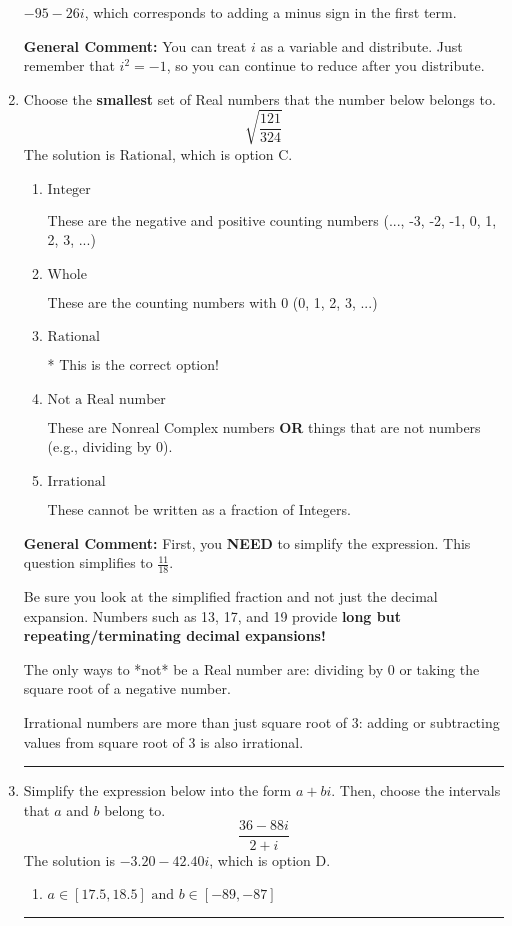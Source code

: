 \documentclass{extbook}[14pt]
\newcommand{\litem}[1]{\item #1

\rule{\textwidth}{0.4pt}}
\begin{document}
\begin{enumerate}
{\begin{enumerate}[label=\Alph*.]
 $-95 - 26 i$, which corresponds to adding a minus sign in the first term.
\end{enumerate}

\textbf{General Comment:} You can treat $i$ as a variable and distribute. Just remember that $i^2=-1$, so you can continue to reduce after you distribute.
}
\litem{
Choose the \textbf{smallest} set of Real numbers that the number below belongs to.
\[ \sqrt{\frac{121}{324}} \]The solution is \( \text{Rational} \), which is option C.\begin{enumerate}[label=\Alph*.]
\item \( \text{Integer} \)

These are the negative and positive counting numbers (..., -3, -2, -1, 0, 1, 2, 3, ...)
\item \( \text{Whole} \)

These are the counting numbers with 0 (0, 1, 2, 3, ...)
\item \( \text{Rational} \)

* This is the correct option!
\item \( \text{Not a Real number} \)

These are Nonreal Complex numbers \textbf{OR} things that are not numbers (e.g., dividing by 0).
\item \( \text{Irrational} \)

These cannot be written as a fraction of Integers.
\end{enumerate}

\textbf{General Comment:} First, you \textbf{NEED} to simplify the expression. This question simplifies to $\frac{11}{18}$. 
 
 Be sure you look at the simplified fraction and not just the decimal expansion. Numbers such as 13, 17, and 19 provide \textbf{long but repeating/terminating decimal expansions!} 
 
 The only ways to *not* be a Real number are: dividing by 0 or taking the square root of a negative number. 
 
 Irrational numbers are more than just square root of 3: adding or subtracting values from square root of 3 is also irrational.
}
\litem{
Simplify the expression below into the form $a+bi$. Then, choose the intervals that $a$ and $b$ belong to.
\[ \frac{36 - 88 i}{2 + i} \]The solution is \( -3.20  - 42.40 i \), which is option D.\begin{enumerate}[label=\Alph*.]
\item \( a \in [17.5, 18.5] \text{ and } b \in [-89, -87] \)


\end{enumerate}}
\end{enumerate}
\end{document}
